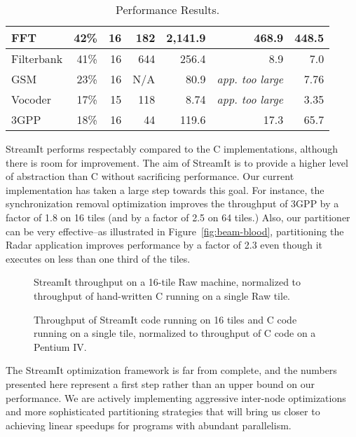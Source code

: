 \begin{table*}[htpb]
\begin{center}
\begin{tabular}{|l||r|r|r|r||r||r||}
FFT    & 42\% & 16  & 182 &  2,141.9 & 468.9 & 448.5  \\ \hline
Filterbank & 
       41\% & 16  &  644 &   256.4  & 8.9 & 7.0   \\ \hline
GSM    & 23\% & 16 & N/A &    80.9  & {\it app. too large} & 7.76 \\ \hline
Vocoder& 17\% & 15  & 118 &     8.74  & {\it app. too large} & 3.35  \\ \hline
3GPP   & 18\% & 16  & 44 &   119.6  & 17.3  & 65.7   \\ \hline \hline
\end{tabular}
\vspace{-6pt}
\caption{\protect\small Performance Results.}
\label{tab:performance}
\end{center}
\vspace{-12pt}
\end{table*}


StreamIt performs respectably compared to the C implementations,
although there is room for improvement.  The aim of StreamIt is to
provide a higher level of abstraction than C without sacrificing
performance.  Our current implementation has taken a large step
towards this goal.  For instance, the synchronization removal
optimization improves the throughput of 3GPP by a factor of 1.8 on 16
tiles (and by a factor of 2.5 on 64 tiles.)  Also, our partitioner can
be very effective--as illustrated in Figure~\ref{fig:beam-blood},
partitioning the Radar application improves performance by a factor
of 2.3 even though it executes on less than one third of the tiles.


\begin{figure}[htpb]
\centering
\vspace{6pt}
\begin{minipage}{3.0in}
\centering
{}
\vspace{-6pt}
\caption{\protect\small StreamIt throughput on a 16-tile Raw machine,
normalized to throughput of hand-written C running on a single Raw
tile.  \protect\label{fig:compare-raw}}
\end{minipage}
\hspace{0.1in}
\begin{minipage}{3.0in}
\centering
{}
\vspace{-6pt}
\caption{Throughput of StreamIt code running on 16 tiles and C code
running on a single tile, normalized to throughput of C code on a
Pentium IV. \protect\label{fig:compare-pentium}}
\end{minipage}
\end{figure}

The StreamIt optimization framework is far from complete, and the
numbers presented here represent a first step rather than an upper
bound on our performance.  We are actively implementing aggressive
inter-node optimizations and more sophisticated partitioning
strategies that will bring us closer to achieving linear speedups for
programs with abundant parallelism.

